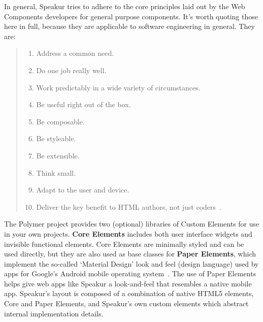 In general, Speakur tries to adhere to the core principles laid out by the 
Web Components developers 
for general purpose components. 
It's worth quoting those here in full, 
because they are applicable to software engineering in general. They are:\label{sec:wcprinciples}
\begin{quote}
\begin{enumerate}
\item Address a common need.\label{wcp:commonneed}
\item Do one job really well.\label{wcp:onejob}
\item Work predictably in a wide variety of circumstances.\label{wcp:predicatable}
\item Be useful right out of the box.\label{wcp:useful}
\item Be composable.\label{wcp:composable}
\item Be styleable.\label{wcp:stylable}
\item Be extensible.\label{wcp:extensible}
\item Think small.\label{wcp:thinksmall}
\item Adapt to the user and device.\label{wcp:adaptable}
\item Deliver the key benefit to HTML authors, not just coders~\label{wcp:htmlauthors}\cite{webcomponentscontributors2014}.
\end{enumerate}
\end{quote}

The Polymer project provides two (optional) libraries of Custom Elements for use in your own projects. 
\textbf{Core Elements} includes both user interface
widgets and invisible functional elements.
Core Elements are minimally styled and can be used directly, 
but they are also used as base classes for 
\textbf{Paper Elements}, 
which implement the so-called `Material Design' look and feel (design language) used by apps for Google's Android mobile operating system~\cite{imura2015}.
The use of Paper Elements helps give web apps like Speakur a look-and-feel that resembles a native mobile app.
Speakur's layout is composed of a combination of native HTML5 elements, 
Core and Paper Elements, 
and Speakur's own custom elements which abstract internal implementation details.

